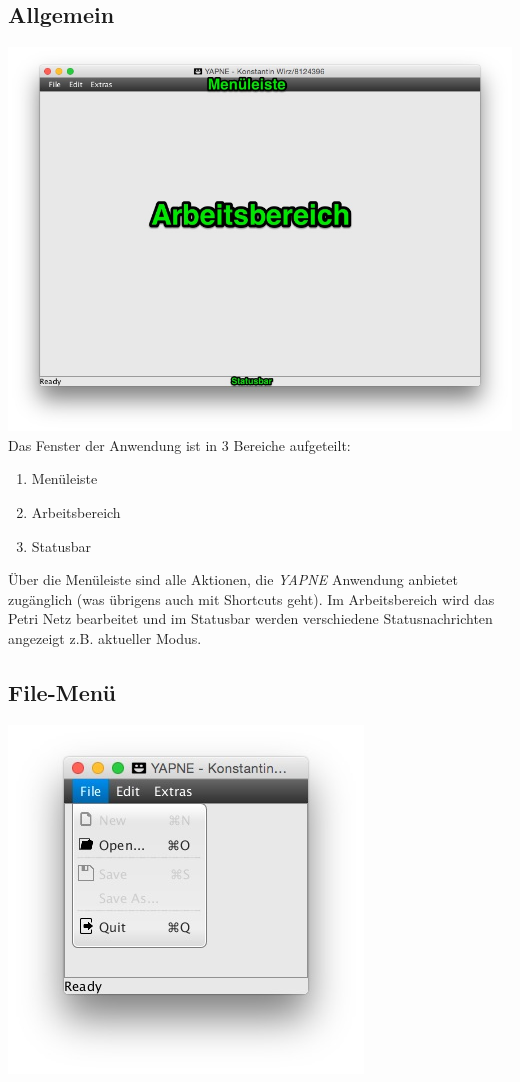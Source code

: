 \documentclass[12pt]{article}
\begin{document}
\subsection{Allgemein}
\includegraphics[width=\linewidth]{start_screen} \\
Das Fenster der Anwendung ist in 3 Bereiche aufgeteilt:
\begin{enumerate}
\item{Menüleiste}
\item{Arbeitsbereich}
\item{Statusbar}
\end{enumerate}
Über die Menüleiste sind alle Aktionen, die \emph{YAPNE} Anwendung anbietet zugänglich (was übrigens auch mit Shortcuts geht). Im Arbeitsbereich wird das Petri Netz bearbeitet und im Statusbar werden verschiedene Statusnachrichten angezeigt z.B. aktueller Modus.



\subsection{File-Menü} 

\includegraphics{menu_file}
\end{document}
